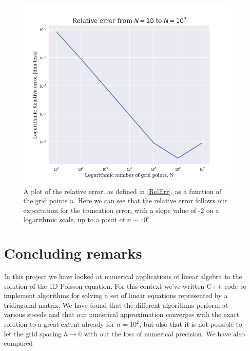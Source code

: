 \documentclass[12pt]{article}
\numberwithin{figure}{section}
\numberwithin{table}{section}
\begin{document}
\begin{figure}[ht]
	\label{fig:relerr}
	\centerline{\includegraphics[scale = 0.70]{relative_error.png}}
	\caption{A plot of the relative error, as defined in \eqref{RelErr}, as a function of the grid points $n$. Here we can see that the relative error follows our expectation for the truncation error, with a slope value of -2 on a logarithmic scale, up to a point of $n\sim 10^5$.}
\end{figure}

%

\section{Concluding remarks}
\noindent In this project we have looked at numerical applications of linear algebra to the solution of the 1D Poisson equation. For this context we've written C++ code to implement algorithms for solving a set of linear equations represented by a tridiagonal matrix. We have found that the different algorithms perform at various speeds and that our numerical approximation converges with the exact solution to a great extent already for $n=10^2$, but also that it is not possible to let the grid spacing $h \to 0$ with out the loss of numerical precision. We have also compared \\
\end{document}
